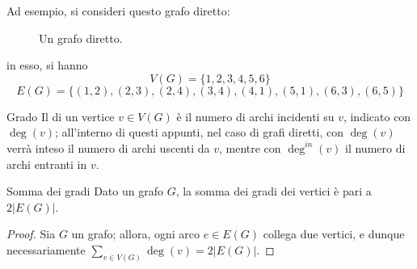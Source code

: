 \documentclass[a4paper, 12pt]{report}
\begin{document}
    \begin{example}
        Ad esempio, si consideri questo grafo diretto:

        \begin{figure}[H]
            \centering
            \caption{Un grafo diretto.}
        \end{figure}

        in esso, si hanno $$V(G) = \{1, 2, 3, 4, 5, 6\}$$ $$E(G) = \{(1, 2), (2, 3), (2, 4), (3, 4), (4, 1), (5, 1), (6, 3), (6, 5)\}$$
    \end{example}

    \begin{frameddefn}{Grado}
        Il  di un vertice $v \in V(G)$ è il numero di archi incidenti su $v$, indicato con $\deg(v)$; all'interno di questi appunti, nel caso di grafi diretti, con $\deg(v)$ verrà inteso il numero di archi uscenti da $v$, mentre con $\deg^{in}(v)$ il numero di archi entranti in $v$.
    \end{frameddefn}

    \begin{framedlem}[label={Somma dei gradi}]{Somma dei gradi}
        Dato un grafo $G$, la somma dei gradi dei vertici è pari a $2 |E(G)|$.
    \end{framedlem}

    \begin{proof}
        Sia $G$ un grafo; allora, ogni arco $e \in E(G)$ collega due vertici, e dunque necessariamente $\displaystyle \sum_{v \in V(G)}{\deg(v)} = 2 |E(G)|$.
    \end{proof}
\end{document}
